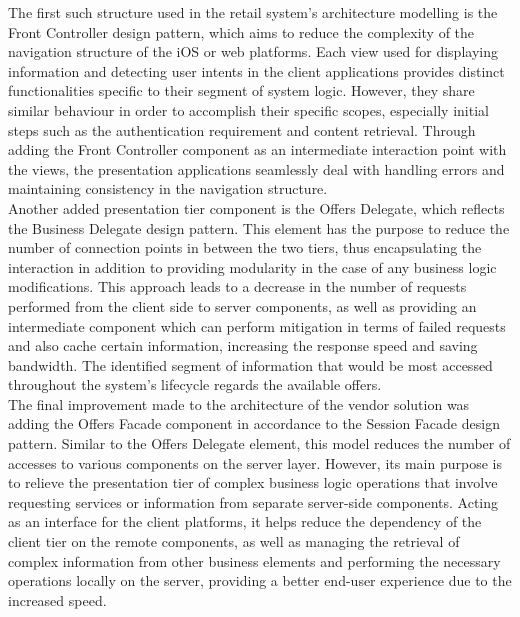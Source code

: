 The first such structure used in the retail system's architecture modelling is the Front Controller design pattern, which aims to reduce the complexity of the navigation structure of the iOS or web platforms. Each view used for displaying information and detecting user intents in the client applications provides distinct functionalities specific to their segment of system logic. However, they share similar behaviour in order to accomplish their specific scopes, especially initial steps such as the authentication requirement and content retrieval. Through adding the Front Controller component as an intermediate interaction point with the views, the presentation applications seamlessly deal with handling errors and maintaining consistency in the navigation structure.\\

Another added presentation tier component is the Offers Delegate, which reflects the Business Delegate design pattern. This element has the purpose to reduce the number of connection points in between the two tiers, thus encapsulating the interaction in addition to providing modularity in the case of any business logic modifications. This approach leads to a decrease in the number of requests performed from the client side to server components, as well as providing an intermediate component which can perform mitigation in terms of failed requests and also cache certain information, increasing the response speed and saving bandwidth. The identified segment of information that would be most accessed throughout the system's lifecycle regards the available offers.\\

The final improvement made to the architecture of the vendor solution was adding the Offers Facade component in accordance to the Session Facade design pattern. Similar to the Offers Delegate element, this model reduces the number of accesses to various components on the server layer. However, its main purpose is to relieve the presentation tier of complex business logic operations that involve requesting services or information from separate server-side components. Acting as an interface for the client platforms, it helps reduce the dependency of the client tier on the remote components, as well as 
managing the retrieval of complex information from other business elements and performing the necessary operations locally on the server, providing a better end-user experience due to the increased speed.\\